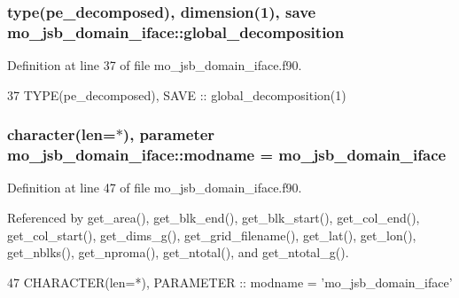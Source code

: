 \subsubsection[{global\+\_\+decomposition}]{\setlength{\rightskip}{0pt plus 5cm}type(pe\+\_\+decomposed), dimension(1), save mo\+\_\+jsb\+\_\+domain\+\_\+iface\+::global\+\_\+decomposition}\label{namespacemo__jsb__domain__iface_af4a20b2bcbe28bcb3a12e209c85fa762}


Definition at line 37 of file mo\+\_\+jsb\+\_\+domain\+\_\+iface.\+f90.


\begin{DoxyCode}
37   \textcolor{keywordtype}{TYPE}(pe\_decomposed), \textcolor{keywordtype}{SAVE} :: global\_decomposition(1)
\end{DoxyCode}
\hypertarget{namespacemo__jsb__domain__iface_af1037ce2c7c80ed94354f71e9a8f33d0}{}
\subsubsection[{modname}]{\setlength{\rightskip}{0pt plus 5cm}character(len=$\ast$), parameter mo\+\_\+jsb\+\_\+domain\+\_\+iface\+::modname = \textquotesingle{}mo\+\_\+jsb\+\_\+domain\+\_\+iface\textquotesingle{}}\label{namespacemo__jsb__domain__iface_af1037ce2c7c80ed94354f71e9a8f33d0}


Definition at line 47 of file mo\+\_\+jsb\+\_\+domain\+\_\+iface.\+f90.



Referenced by get\+\_\+area(), get\+\_\+blk\+\_\+end(), get\+\_\+blk\+\_\+start(), get\+\_\+col\+\_\+end(), get\+\_\+col\+\_\+start(), get\+\_\+dims\+\_\+g(), get\+\_\+grid\+\_\+filename(), get\+\_\+lat(), get\+\_\+lon(), get\+\_\+nblks(), get\+\_\+nproma(), get\+\_\+ntotal(), and get\+\_\+ntotal\+\_\+g().


\begin{DoxyCode}
47   \textcolor{keywordtype}{CHARACTER(len=*)}, \textcolor{keywordtype}{PARAMETER} :: modname = \textcolor{stringliteral}{'mo\_jsb\_domain\_iface'}
\end{DoxyCode}
\hypertarget{namespacemo__jsb__domain__iface_a0afd1d2a27a8d25a8e915997494b19ed}{}
